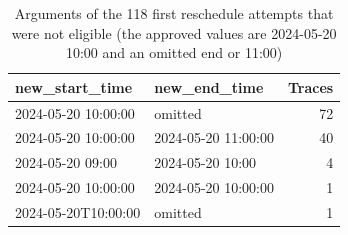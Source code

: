 \begin{table}[t]
\caption{Arguments of the 118 first reschedule attempts that were not eligible (the approved values are 2024-05-20 10:00 and an omitted end or 11:00)}
\label{tab:args}
\centering
\footnotesize
\begin{tabular}{llr}
\toprule
new\_start\_time & new\_end\_time & Traces \\
\midrule
2024-05-20 10:00:00 & omitted & 72 \\
2024-05-20 10:00:00 & 2024-05-20 11:00:00 & 40 \\
2024-05-20 09:00 & 2024-05-20 10:00 & 4 \\
2024-05-20 10:00:00 & 2024-05-20 10:00:00 & 1 \\
2024-05-20T10:00:00 & omitted & 1 \\
\bottomrule
\end{tabular}
\end{table}
